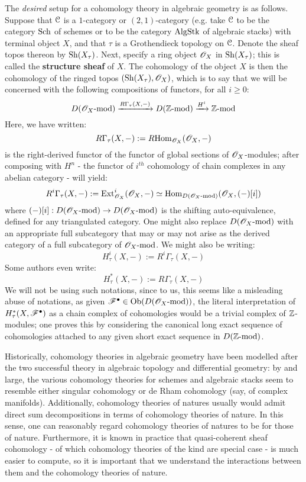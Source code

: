         The \textit{desired} setup for a cohomology theory in algebraic geometry is as follows. Suppose that $\mathcal{C}$ is a $1$-category or $(2, 1)$-category (e.g. take $\mathcal{C}$ to be the category $\mathrm{Sch}$ of schemes or to be the category $\mathrm{Alg}\mathrm{Stk}$ of algebraic stacks) with terminal object $X$, and that $\tau$ is a Grothendieck topology on $\mathcal{C}$. Denote the sheaf topos thereon by $\mathrm{Sh}(X_{\tau})$. Next, specify a ring object $\mathscr{O}_X$ in $\mathrm{Sh}(X_{\tau})$; this is called the \textbf{structure sheaf} of $X$. The cohomology of the object $X$ is then the cohomology of the ringed topos $( \mathrm{Sh}(X_{\tau}), \mathscr{O}_X )$, which is to say that we will be concerned with the following compositions of functors, for all $i \geq 0$:
            $$D(\mathscr{O}_X\text{-}\mathrm{mod}) \xrightarrow[]{R\Gamma_{\tau}(X, -)} D(\mathbb{Z}\text{-}\mathrm{mod}) \xrightarrow[]{H^i} \mathbb{Z}\text{-}\mathrm{mod}$$
        Here, we have written:
            $$R\Gamma_{\tau}(X, -) := R\mathrm{Hom}_{\mathscr{O}_X}(\mathscr{O}_X, -)$$
        is the right-derived functor of the functor of global sections of $\mathscr{O}_X$-modules; after composing with $H^n$ - the functor of $i^{th}$ cohomology of chain complexes in any abelian category - will yield:
            $$R^i\Gamma_{\tau}(X, -) := \mathrm{Ext}^i_{\mathscr{O}_X}(\mathscr{O}_X, -) \simeq \mathrm{Hom}_{D(\mathscr{O}_X\text{-}\mathrm{mod})}(\mathscr{O}_X, (-)[i])$$
        where $(-)[i]: D(\mathscr{O}_X\text{-}\mathrm{mod}) \to D(\mathscr{O}_X\text{-}\mathrm{mod})$ is the shifting auto-equivalence, defined for any triangulated category. One might also replace $D(\mathscr{O}_X\text{-}\mathrm{mod})$ with an appropriate full subcategory that may or may not arise as the derived category of a full subcategory of $\mathscr{O}_X\text{-}\mathrm{mod}$. We might also be writing:
            $$H^i_{\tau}(X, -) := R^i\Gamma_{\tau}(X, -)$$
        Some authors even write:
            $$H^*_{\tau}(X, -) := R\Gamma_{\tau}(X, -)$$
        We will not be using such notations, since to us, this seems like a misleading abuse of notations, as given $\mathscr{F}^{\bullet} \in \mathrm{Ob}( D(\mathscr{O}_X\text{-}\mathrm{mod}) )$, the literal interpretation of $H^*_{\tau}(X, \mathscr{F}^{\bullet})$ as a chain complex of cohomologies would be a trivial complex of $\mathbb{Z}$-modules; one proves this by considering the canonical long exact sequence of cohomologies attached to any given short exact sequence in $D(\mathbb{Z}\text{-}\mathrm{mod})$. 
    
        Historically, cohomology theories in algebraic geometry have been modelled after the two successful theory in algebraic topology and differential geometry: by and large, the various cohomology theories for schemes and algebraic stacks seem to resemble either singular cohomology or de Rham cohomology (say, of complex manifolds). Additionally, cohomology theories of  natures usually would admit direct sum decompositions in terms of cohomology theories of  nature. In this sense, one can reasonably regard cohomology theories of  natures to be  for those of  nature. Furthermore, it is known in practice that quasi-coherent sheaf cohomology - of which cohomology theories of the  kind are special case - is much easier to compute, so it is important that we understand the interactions between them and the cohomology theories of  nature. 

